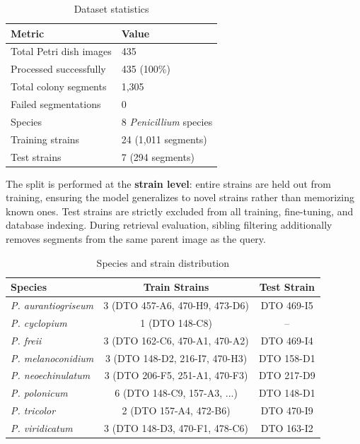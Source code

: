\begin{table}[h]
\centering
\caption{Dataset statistics}
\begin{tabular}{@{}ll@{}}
\toprule
\textbf{Metric} & \textbf{Value} \\
\midrule
Total Petri dish images & 435 \\
Processed successfully & 435 (100\%) \\
Total colony segments & 1,305 \\
Failed segmentations & 0 \\
Species & 8 \textit{Penicillium} species \\
Training strains & 24 (1,011 segments) \\
Test strains & 7 (294 segments) \\
\bottomrule
\end{tabular}
\end{table}

The split is performed at the \textbf{strain level}: entire strains are held out from training, ensuring the model generalizes to novel strains rather than memorizing known ones. Test strains are strictly excluded from all training, fine-tuning, and database indexing. During retrieval evaluation, sibling filtering additionally removes segments from the same parent image as the query.

\begin{table}[h]
\centering
\caption{Species and strain distribution}
\begin{tabular}{@{}lcc@{}}
\toprule
\textbf{Species} & \textbf{Train Strains} & \textbf{Test Strain} \\
\midrule
\textit{P. aurantiogriseum} & 3 (DTO 457-A6, 470-H9, 473-D6) & DTO 469-I5 \\
\textit{P. cyclopium} & 1 (DTO 148-C8) & -- \\
\textit{P. freii} & 3 (DTO 162-C6, 470-A1, 470-A2) & DTO 469-I4 \\
\textit{P. melanoconidium} & 3 (DTO 148-D2, 216-I7, 470-H3) & DTO 158-D1 \\
\textit{P. neoechinulatum} & 3 (DTO 206-F5, 251-A1, 470-F3) & DTO 217-D9 \\
\textit{P. polonicum} & 6 (DTO 148-C9, 157-A3, ...) & DTO 148-D1 \\
\textit{P. tricolor} & 2 (DTO 157-A4, 472-B6) & DTO 470-I9 \\
\textit{P. viridicatum} & 3 (DTO 148-D3, 470-F1, 478-C6) & DTO 163-I2 \\
\bottomrule
\end{tabular}
\end{table}

